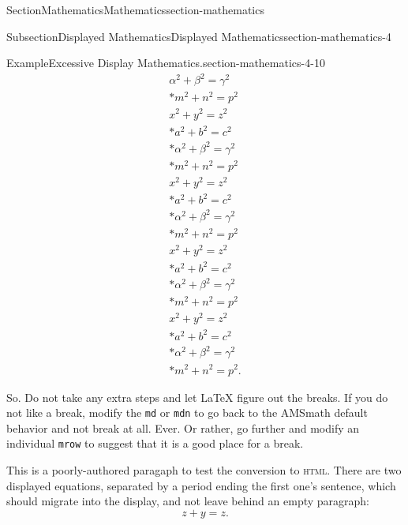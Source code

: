 \documentclass[twoside,10pt,]{article}
\newcommand{\mono}[1]{\texttt{#1}}
\newcommand{\initialism}[1]{\textsc{\MakeLowercase{#1}}}
\numberwithin{equation}{section}
\begin{document}
\begin{sectionptx}{Section}{Mathematics}{}{Mathematics}{}{}{section-mathematics}
\begin{subsectionptx}{Subsection}{Displayed Mathematics}{}{Displayed Mathematics}{}{}{section-mathematics-4}
\begin{example}{Example}{Excessive Display Mathematics.}{section-mathematics-4-10}
\begin{gather}
\alpha^2+\beta^2=\gamma^2\label{section-mathematics-4-10-3-2-31}\\*
m^2+n^2=p^2\label{section-mathematics-4-10-3-2-32}\\
x^2+y^2=z^2\label{section-mathematics-4-10-3-2-33}\\*
a^2+b^2=c^2\label{section-mathematics-4-10-3-2-34}\\*
\alpha^2+\beta^2=\gamma^2\label{section-mathematics-4-10-3-2-35}\\*
m^2+n^2=p^2\label{section-mathematics-4-10-3-2-36}\\
x^2+y^2=z^2\label{section-mathematics-4-10-3-2-37}\\*
a^2+b^2=c^2\label{section-mathematics-4-10-3-2-38}\\*
\alpha^2+\beta^2=\gamma^2\label{section-mathematics-4-10-3-2-39}\\*
m^2+n^2=p^2\label{section-mathematics-4-10-3-2-40}\\
x^2+y^2=z^2\label{section-mathematics-4-10-3-2-41}\\*
a^2+b^2=c^2\label{section-mathematics-4-10-3-2-42}\\*
\alpha^2+\beta^2=\gamma^2\label{section-mathematics-4-10-3-2-43}\\*
m^2+n^2=p^2\label{section-mathematics-4-10-3-2-44}\\
x^2+y^2=z^2\label{section-mathematics-4-10-3-2-45}\\*
a^2+b^2=c^2\label{section-mathematics-4-10-3-2-46}\\*
\alpha^2+\beta^2=\gamma^2\label{section-mathematics-4-10-3-2-47}\\*
m^2+n^2=p^2\text{.}\label{section-mathematics-4-10-3-2-48}
\end{gather}
%
\par
So.  Do not take any extra steps and let \LaTeX{} figure out the breaks.  If you do not like a break, modify the \mono{md} or \mono{mdn} to go back to the AMSmath default behavior and not break at all.  Ever.  Or rather, go further and modify an individual \mono{mrow} to suggest that it is a good place for a break.%
\end{example}
This is a poorly-authored paragaph to test the conversion to \initialism{HTML}.  There are two displayed equations, separated by a period ending the first one's sentence, which should migrate into the display, and not leave behind an empty paragraph:%
\begin{equation*}
z+y = z\text{.}
\end{equation*}
%
\begin{equation*}

\end{equation*}
\end{subsectionptx}
\end{sectionptx}
\end{document}
